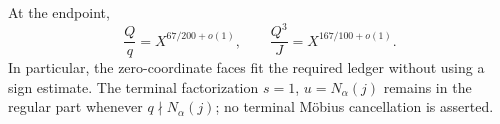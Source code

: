At the endpoint,
\begin{equation}
 \frac Qq=X^{67/200+o(1)},\qquad
 \frac{Q^3}{J}=X^{167/100+o(1)}.
 \label{eq:tpc37-face-endpoint-ledger}
\end{equation}
In particular, the zero-coordinate faces fit the required ledger without
using a sign estimate.  The terminal factorization \(s=1\), \(u=N_\alpha(j)\)
remains in the regular part whenever \(q\nmid N_\alpha(j)\); no terminal
M\"obius cancellation is asserted.
